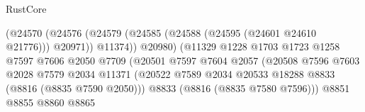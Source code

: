 \begin{lexlean}{RustCore}
\begin{coremodule}
                                                    (@24570
                                                      (@24576
                                                        (@24579
                                                          (@24585
                                                            (@24588 (@24595 (@24601 @24610 @21776)))
                                                            @20971))
                                                        @11374))
                                                    @20980)
                                                  (@11329
                                                    @1228
                                                    @1703
                                                    @1723
                                                    @1258
                                                    @7597
                                                    @7606
                                                    @2050
                                                    @7709
                                                    (@20501
                                                      @7597
                                                      @7604
                                                      @2057
                                                      (@20508
                                                        @7596
                                                        @7603
                                                        @2028
                                                        @7579
                                                        @2034
                                                        @11371
                                                        (@20522
                                                          @7589
                                                          @2034
                                                          @20533
                                                          @18288
                                                          @8833
                                                          (@8816 (@8835 @7590 @2050)))
                                                        @8833
                                                        (@8816 (@8835 @7580 @7596)))
                                                      @8851
                                                      @8855
                                                      @8860
                                                      @8865

\end{coremodule}
\end{lexlean}
